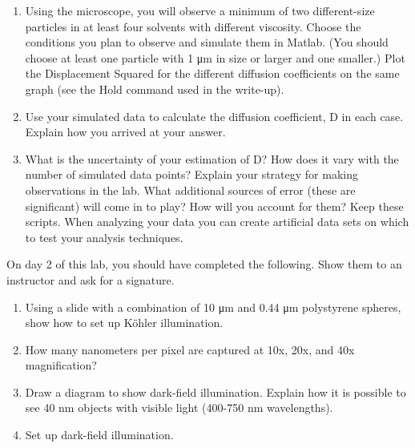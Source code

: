 \documentclass{../signatures}
\begin{document}
\begin{enumerate}

\item Using the microscope, you will observe a minimum of two different-size particles in at least four solvents with different viscosity. Choose the conditions you plan to observe and simulate them in Matlab. (You should choose at least one particle with 1 μm in size or larger and one smaller.) Plot the Displacement Squared for the different diffusion coefficients on the same graph (see the Hold command used in the write-up).

\item Use your simulated data to calculate the diffusion coefficient, D in each case. Explain how you arrived at your answer. 

\item What is the uncertainty of your estimation of D? How does it vary with the number of simulated data points? Explain your strategy for making observations in the lab. What additional sources of error (these are significant) will come in to play? How will you account for them? Keep these scripts. When analyzing your data you can create artificial data sets on which to test your analysis techniques. 
\\[36pt]
\end{enumerate}


\midlab

On day 2 of this lab, you should have completed the following. Show them to an instructor and ask for a signature.

\begin{enumerate}

    \item Using a slide with a combination of 10 μm and 0.44 μm polystyrene spheres, show how to set up K\"ohler illumination.
    
    \item How many nanometers per pixel are captured at 10x, 20x, and 40x magnification?
    
    \item Draw a diagram to show dark-field illumination. Explain how it is possible to see 40 nm objects with visible light (400-750 nm wavelengths).
    
    \item Set up dark-field illumination.
\\[36pt]
\end{enumerate}
\end{document}
